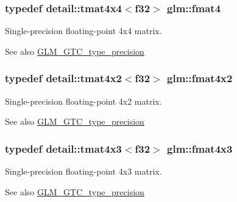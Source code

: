 \subsubsection[{fmat4}]{\setlength{\rightskip}{0pt plus 5cm}typedef detail\+::tmat4x4$<$f32$>$ {\bf glm\+::fmat4}}\label{group__gtc__type__precision_ga055416da4fe01f31008a03b52a80d174}
Single-\/precision floating-\/point 4x4 matrix. \begin{DoxySeeAlso}{See also}
\hyperlink{group__gtc__type__precision}{G\+L\+M\+\_\+\+G\+T\+C\+\_\+type\+\_\+precision} 
\end{DoxySeeAlso}
\hypertarget{group__gtc__type__precision_ga532054b5f4c6f8cadec059d83e188104}{}
\subsubsection[{fmat4x2}]{\setlength{\rightskip}{0pt plus 5cm}typedef detail\+::tmat4x2$<$f32$>$ {\bf glm\+::fmat4x2}}\label{group__gtc__type__precision_ga532054b5f4c6f8cadec059d83e188104}
Single-\/precision floating-\/point 4x2 matrix. \begin{DoxySeeAlso}{See also}
\hyperlink{group__gtc__type__precision}{G\+L\+M\+\_\+\+G\+T\+C\+\_\+type\+\_\+precision} 
\end{DoxySeeAlso}
\hypertarget{group__gtc__type__precision_ga55d2df2d8b1b94d495125530fac1da69}{}
\subsubsection[{fmat4x3}]{\setlength{\rightskip}{0pt plus 5cm}typedef detail\+::tmat4x3$<$f32$>$ {\bf glm\+::fmat4x3}}\label{group__gtc__type__precision_ga55d2df2d8b1b94d495125530fac1da69}
Single-\/precision floating-\/point 4x3 matrix. \begin{DoxySeeAlso}{See also}
\hyperlink{group__gtc__type__precision}{G\+L\+M\+\_\+\+G\+T\+C\+\_\+type\+\_\+precision} 
\end{DoxySeeAlso}
\hypertarget{group__gtc__type__precision_gad011717dba7e15802233b335618d8969}{}

